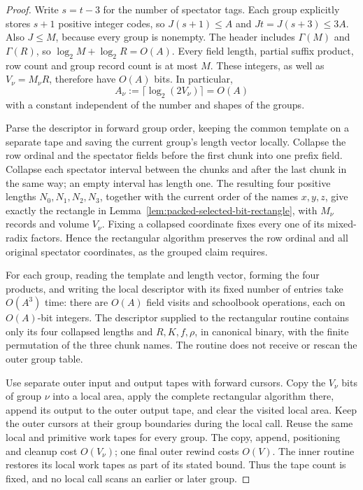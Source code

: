 \documentclass[11pt]{article}
\theoremstyle{definition}
\begin{document}
\begin{proof}
Write $s=t-3$ for the number of spectator tags. Each group explicitly
stores $s+1$ positive integer codes, so $J(s+1)\le A$ and
$Jt=J(s+3)\le3A$. Also $J\le M$, because every group is nonempty.
The header includes $\Gamma(M)$ and $\Gamma(R)$, so
$\log_2 M+\log_2 R=O(A)$. Every field length, partial suffix product,
row count and group record count is at most $M$. These integers, as well
as $V_\nu=M_\nu R$, therefore have $O(A)$ bits. In particular,
\[
 A_\nu:=\lceil\log_2(2V_\nu)\rceil=O(A)
\]
with a constant independent of the number and shapes of the groups.

Parse the descriptor in forward group order, keeping the common template
on a separate tape and saving the current group's length vector locally.
Collapse the row ordinal and the spectator fields before the first chunk
into one prefix field. Collapse each spectator interval between the chunks
and after the last chunk in the same way; an empty interval has length
one. The resulting four positive lengths $N_0,N_1,N_2,N_3$, together
with the current order of the names $x,y,z$, give exactly the rectangle
in Lemma~\ref{lem:packed-selected-bit-rectangle}, with $M_\nu$ records
and volume $V_\nu$. Fixing a collapsed coordinate fixes every one of its
mixed-radix factors. Hence the rectangular algorithm preserves the row
ordinal and all original spectator coordinates, as the grouped claim
requires.

For each group, reading the template and length vector, forming the four
products, and writing the local descriptor with its fixed number of
entries take $O(A^3)$ time:
there are $O(A)$ field visits and schoolbook operations, each on
$O(A)$-bit integers. The descriptor supplied to the rectangular routine
contains only its four collapsed lengths and $R,K,f,\rho$, in canonical
binary, with the finite permutation of the three chunk names. The
routine does not receive or rescan the outer group table.

Use separate outer input and output tapes with forward cursors. Copy the
$V_\nu$ bits of group $\nu$ into a local area, apply the complete
rectangular algorithm there, append its output to the outer output tape,
and clear the visited local area. Keep the outer cursors at their group
boundaries during the local call. Reuse the same local and primitive work
tapes for every group. The copy, append, positioning and cleanup cost
$O(V_\nu)$; one final outer rewind costs $O(V)$. The inner routine
restores its local work tapes as part of its stated bound. Thus the tape
count is fixed, and no local call scans an earlier or later group.


\end{proof}
\end{document}
